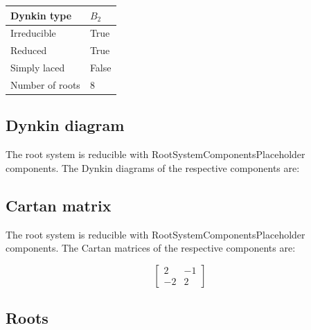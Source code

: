 \documentclass[11pt]{article}
\theoremstyle{definition}
\newif\ifrootsystemirreducible
\begin{document}
\begin{tabular}{|l|l|}
	\hline
    Dynkin type & $B_2$ \\
	\hline
    Irreducible & True \\
	\hline
    Reduced & True \\
	\hline
	Simply laced & False \\
	\hline
	Number of roots & $8$ \\
	\hline
\end{tabular}

\subsection{Dynkin diagram}

\ifrootsystemirreducible
The root system is irreducible and has Dynkin diagram:
\else
The root system is reducible with RootSystemComponentsPlaceholder components. The Dynkin diagrams of the respective components are:
\fi

\begin{center}
\end{center}

\subsection{Cartan matrix}

\ifrootsystemirreducible
The root system is irreducible and has Cartan matrix:
\else
The root system is reducible with RootSystemComponentsPlaceholder components. The Cartan matrices of the respective components are:
\fi

\[
\left[\begin{matrix}2 & -1\\-2 & 2\end{matrix}\right]
\]

\subsection{Roots}
\end{document}
